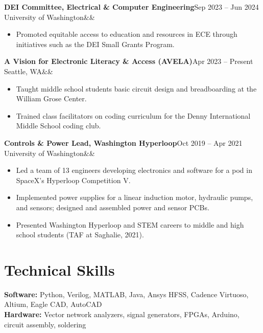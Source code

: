 \documentclass[11pt,letterpaper]{article}
\newcommand{\cventry}[4]{%
  \textbf{#1}\hfill #2\\
  #3\ifx&#4&\else\\ \textit{#4}\fi\par\vspace{2pt}}
\begin{document}
\cventry{DEI Committee, Electrical \& Computer Engineering}{Sep 2023 -- Jun 2024}
        {University of Washington}{}
\begin{itemize}
  \item Promoted equitable access to education and resources in ECE through initiatives such as the DEI Small Grants Program.
\end{itemize}

\cventry{A Vision for Electronic Literacy \& Access (AVELA)}{Apr 2023 -- Present}{Seattle, WA}{}
\begin{itemize}
  \item Taught middle school students basic circuit design and breadboarding at the William Grose Center.
  \item Trained class facilitators on coding curriculum for the Denny International Middle School coding club.
\end{itemize}

\cventry{Controls \& Power Lead, Washington Hyperloop}{Oct 2019 -- Apr 2021}{University of Washington}{}
\begin{itemize}
  \item Led a team of 13 engineers developing electronics and software for a pod in SpaceX's Hyperloop Competition V.
  \item Implemented power supplies for a linear induction motor, hydraulic pumps, and sensors; designed and assembled power and sensor PCBs.
  \item Presented Washington Hyperloop and STEM careers to middle and high school students (TAF at Saghalie, 2021).
\end{itemize}

\section{Technical Skills}
\textbf{Software:} Python, Verilog, MATLAB, Java, Ansys HFSS, Cadence Virtuoso, Altium, Eagle CAD, AutoCAD\\
\textbf{Hardware:} Vector network analyzers, signal generators, FPGAs, Arduino, circuit assembly, soldering
\end{document}
